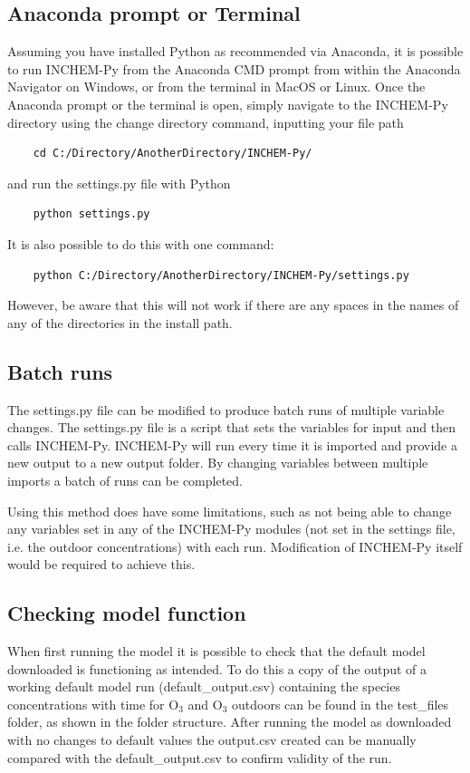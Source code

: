 \documentclass[a4paper]{refart}
\begin{document}
\subsection{Anaconda prompt or Terminal}
Assuming you have installed Python as recommended via Anaconda, it is possible to run INCHEM-Py from the Anaconda CMD prompt from within the Anaconda Navigator on Windows, or from the terminal in MacOS or Linux. Once the Anaconda prompt or the terminal is open, simply navigate to the INCHEM-Py directory using the change directory command, inputting your file path
\begin{verbatim}
    cd C:/Directory/AnotherDirectory/INCHEM-Py/
\end{verbatim}
and run the settings.py file with Python
\begin{verbatim}
    python settings.py
\end{verbatim}
It is also possible to do this with one command:
\begin{verbatim}
    python C:/Directory/AnotherDirectory/INCHEM-Py/settings.py
\end{verbatim}
However, be aware that this will not work if there are any spaces in the names of any of the directories in the install path.

\subsection{Batch runs}
The settings.py file can be modified to produce batch runs of multiple variable changes. The settings.py file is a script that sets the variables for input and then calls INCHEM-Py. INCHEM-Py will run every time it is imported and provide a new output to a new output folder. By changing variables between multiple imports a batch of runs can be completed. 

Using this method does have some limitations, such as not being able to change any variables set in any of the INCHEM-Py modules (not set in the settings file, i.e. the outdoor concentrations) with each run. Modification of INCHEM-Py itself would be required to achieve this.

\subsection{Checking model function}
When first running the model it is possible to check that the default model downloaded is functioning as intended. To do this a copy of the output of a working default model run (default\_output.csv) containing the species concentrations with time for O$_3$ and O$_3$ outdoors can be found in the test\_files folder, as shown in the folder structure. After running the model as downloaded with no changes to default values the output.csv created can be manually compared with the default\_output.csv to confirm validity of the run.
\end{document}
